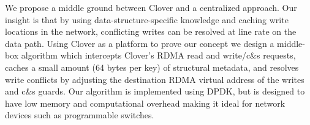 We propose a middle ground between Clover and a centralized approach.
Our insight is that by using data-structure-specific knowledge and
caching write locations in the network, conflicting writes can be
resolved at line rate on the data path.  Using Clover as a platform to
prove our concept we design a middle-box algorithm which intercepts
Clover's RDMA read and write/c\&s requests, caches a small amount (64 bytes
per key) of structural metadata, and resolves write conflicts by
adjusting the destination RDMA virtual address of the writes and c\&s
guards. Our algorithm is implemented using DPDK, but is designed to
have low memory and computational overhead making it ideal for network
devices such as programmable switches.



